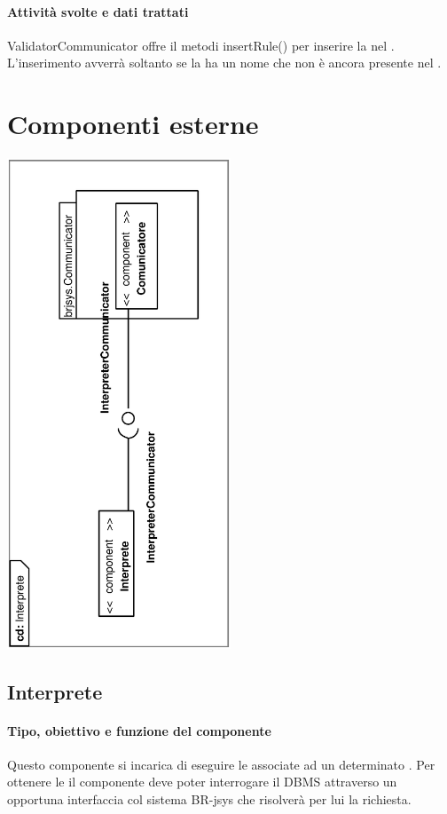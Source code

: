 \documentclass[11pt,titlepage,a4paper]{report}
\begin{document}
\subsubsection{Attivit\`a svolte e dati trattati}
ValidatorCommunicator offre il metodi insertRule() per inserire la \br nel \re. L'inserimento avverr\`a soltanto se la \br ha un nome che non \`e ancora presente nel \re.

\chapter{Componenti esterne}
\begin{center}
 \includegraphics[width=0.5\textwidth, angle=-90]{DiagrammaClassi/Interprete.eps}
\end{center}
\section{Interprete}
\subsubsection{Tipo, obiettivo e funzione del componente}
Questo componente si incarica di eseguire le \brs associate ad un determinato \bo. Per ottenere le \brs il componente deve poter interrogare il DBMS attraverso un opportuna interfaccia col sistema BR-jsys che risolver\`a per lui la richiesta.
\end{document}
